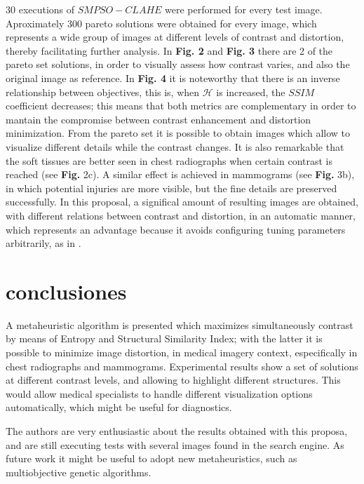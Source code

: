 \documentclass[spanish,twocolumn]{article}
\begin{document}
{ 30 executions of $SMPSO-CLAHE$ were performed for every test image. Aproximately 300 pareto solutions were obtained for every image, which represents a wide group of images at different levels of contrast and distortion, thereby facilitating further analysis. In \textbf {Fig. 2}  and \textbf {Fig. 3} there are 2 of the pareto set solutions, in order to visually assess how contrast varies, and also the original image as reference. In \textbf {Fig. 4} it is noteworthy that there is an inverse relationship between objectives, this is, when $\mathscr{H}$ is increased, the $SSIM$ coefficient decreases; this means that both metrics are complementary in order to mantain the compromise between contrast enhancement and distortion minimization. From the pareto set it is possible to obtain images which allow to visualize different details while the contrast changes. It is also remarkable that the soft tissues are better seen in chest radiographs when certain contrast is reached (see \textbf {Fig.} 2c). A similar effect is achieved in mammograms (see \textbf {Fig.} 3b), in which potential injuries are more visible, but the fine details are preserved successfully. In this proposal, a significal amount of resulting images are obtained, with different relations between contrast and distortion, in an automatic manner, which represents an advantage because it avoids configuring tuning parameters arbitrarily, as in \cite{1419470}.


\section{conclusiones}
\label{sec:conclusion}
A metaheuristic algorithm is presented which maximizes simultaneously contrast by means of Entropy and Structural Similarity Index; with the latter it is possible to minimize image distortion, in medical imagery context, especifically in chest radiographs and mammograms. Experimental results show a set of solutions at different contrast levels, and allowing to highlight different structures. This would allow medical specialists to handle different visualization options automatically, which might be useful for diagnostics.

The authors are very enthusiastic about the results obtained with this proposa, and are still executing tests with several images found in the search engine. As future work it might be useful to adopt new metaheuristics, such as multiobjective genetic algorithms.





}
\end{document}
